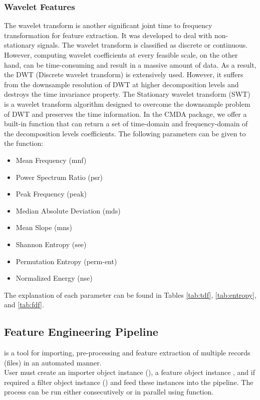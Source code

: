 \documentclass{article}
\begin{document}
\subsubsection{Wavelet Features}
The wavelet transform is another significant joint time to frequency transformation for feature extraction. It was developed to deal with non-stationary signals. The wavelet transform is classified as discrete or continuous. However, computing wavelet coefficients at every feasible scale, on the other hand, can be time-consuming and result in a massive amount of data. As a result, the DWT (Discrete wavelet transform) is extensively used. However, it suffers from the downsample resolution of DWT at higher decomposition levels and destroys the time invariance property. The Stationary wavelet transform (SWT) \cite{combes_real-time_1990} is a wavelet transform algorithm designed to overcome the downsample problem of DWT and preserves the time information. In the CMDA package, we offer a built-in  function that can return a set of time-domain and frequency-domain of the decomposition levels coefficients. The following parameters can be given to the function:
\begin{itemize}
    \item Mean Frequency (mnf)
    \item Power Spectrum Ratio (psr)
    \item Peak Frequency (peak)
    \item Median Absolute Deviation (mds)
    \item Mean Slope (mns)
    \item Shannon Entropy (see)
    \item Permutation Entropy (perm-ent)
    \item Normalized Energy (nse)
\end{itemize}
The explanation of each parameter can be found in Tables \ref{tab:tdf}, \ref{tab:entropy}, and \ref{tab:fdf}.

\subsection{Feature Engineering Pipeline}
 is a tool for importing, pre-processing and feature extraction of multiple records (files) in an automated manner.\\
User must create an importer object instance (), a feature object instance , and if required a filter object instance () and feed these instances into the pipeline. The process can be run either consecutively or in parallel using  function.
\end{document}
